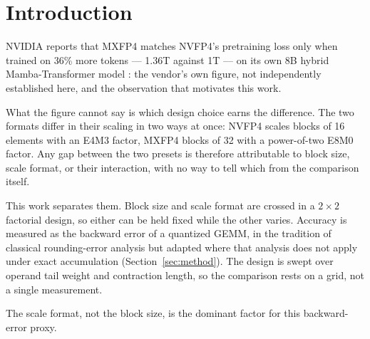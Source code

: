\section{Introduction}
\label{sec:intro}

NVIDIA reports that MXFP4 matches NVFP4's pretraining loss only when trained on
36\% more tokens --- 1.36T against 1T --- on its own 8B hybrid Mamba-Transformer
model \citep{nvidia2026nvfp4}: the vendor's own figure, not independently
established here, and the observation that motivates this work.

What the figure cannot say is which design choice earns the difference. The two
formats differ in their scaling in two ways at once: NVFP4 scales blocks of 16
elements with an E4M3 factor, MXFP4 blocks of 32 with a power-of-two E8M0 factor.
Any gap between the two presets is therefore attributable to block size, scale
format, or their interaction, with no way to tell which from the comparison
itself.

This work separates them. Block size and scale format are crossed in a
$2\times2$ factorial design, so either can be held fixed while the other varies.
Accuracy is measured as the backward error of a quantized GEMM, in the tradition
of classical rounding-error analysis but adapted where that analysis does not
apply under exact accumulation (Section~\ref{sec:method}).
The design is swept over operand tail weight and contraction length, so the
comparison rests on a grid, not a single measurement.

The scale format, not the block size, is the dominant factor for this
backward-error proxy.
